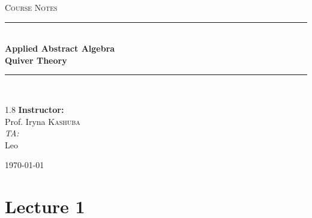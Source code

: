 \documentclass[11pt, a4paper]{report}
\newcommand{\HRule}[1]{\rule{\linewidth}{#1}}
\begin{document}
\begin{titlepage}
    \centering
    \vspace*{2cm}

    \textsc{\Large Course Notes}\\[0.5cm]

    \HRule{1.5pt} \\[0.5cm]
    { \huge \bfseries Applied Abstract Algebra \\[0.3cm] Quiver Theory }\\[0.4cm]
    \HRule{1.5pt} \\[1.5cm]

    \vspace{3cm}

    \begin{spacing}{1.8}
        {\Large \textbf{Instructor:}} \\
        {\Large Prof. Iryna \textsc{Kashuba}} \\[0.8cm]

        {\normalsize \textit{TA:}} \\
        {\normalsize Leo}
    \end{spacing}

    \vfill
    {\large \today}
\end{titlepage}
\newpage
\tableofcontents
\newpage



\chapter{Lecture 1}
\end{document}
